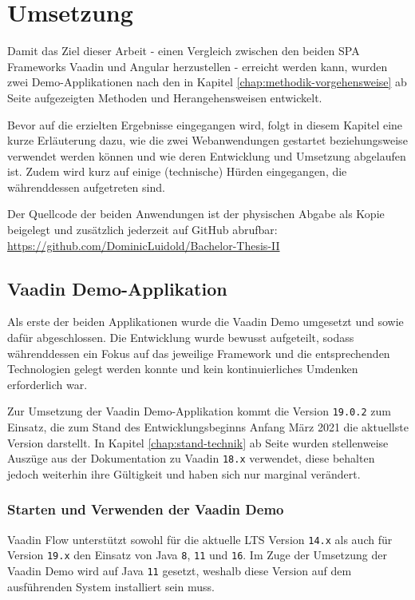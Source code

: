 \documentclass[a4paper,12pt,twoside]{scrreprt}
\begin{document}
\chapter{Umsetzung}
\label{chap:umsetzung}
Damit das Ziel dieser Arbeit - einen Vergleich zwischen den beiden \ac{SPA} Frameworks Vaadin und Angular herzustellen - erreicht werden kann, wurden zwei Demo-Applikationen nach den in Kapitel \ref{chap:methodik-vorgehensweise} ab Seite \pageref{chap:methodik-vorgehensweise} aufgezeigten Methoden und Herangehensweisen entwickelt.

Bevor auf die erzielten Ergebnisse eingegangen wird, folgt in diesem Kapitel eine kurze Erläuterung dazu, wie die zwei Webanwendungen gestartet beziehungsweise verwendet werden können und wie deren Entwicklung und Umsetzung abgelaufen ist. Zudem wird kurz auf einige (technische) Hürden eingegangen, die währenddessen aufgetreten sind.

Der Quellcode der beiden Anwendungen ist der physischen Abgabe als Kopie beigelegt und zusätzlich jederzeit auf GitHub abrufbar: \url{https://github.com/DominicLuidold/Bachelor-Thesis-II}

\section{Vaadin Demo-Applikation}
\label{sec:vaadin-demo}
Als erste der beiden Applikationen wurde die Vaadin Demo umgesetzt und \textit{} sowie \textit{} dafür abgeschlossen. Die Entwicklung wurde bewusst aufgeteilt, sodass währenddessen ein Fokus auf das jeweilige Framework und die entsprechenden Technologien gelegt werden konnte und kein kontinuierliches Umdenken erforderlich war.

\medskip

Zur Umsetzung der Vaadin Demo-Applikation kommt die Version \texttt{19.0.2} zum Einsatz, die zum Stand des Entwicklungsbeginns Anfang März 2021 die aktuellste Version darstellt. In Kapitel \ref{chap:stand-technik} ab Seite \pageref{chap:stand-technik} wurden stellenweise Auszüge aus der Dokumentation zu Vaadin \texttt{18.x} verwendet, diese behalten jedoch weiterhin ihre Gültigkeit und haben sich nur marginal verändert.

\subsection{Starten und Verwenden der Vaadin Demo}
\label{sub-sec:starten-verwenden-vaadin}
Vaadin Flow unterstützt sowohl für die aktuelle \ac{LTS} Version \texttt{14.x} als auch für Version \texttt{19.x} den Einsatz von Java \texttt{8}, \texttt{11} und \texttt{16}. Im Zuge der Umsetzung der Vaadin Demo wird auf Java \texttt{11} gesetzt, weshalb diese Version auf dem ausführenden System installiert sein muss.
\end{document}

